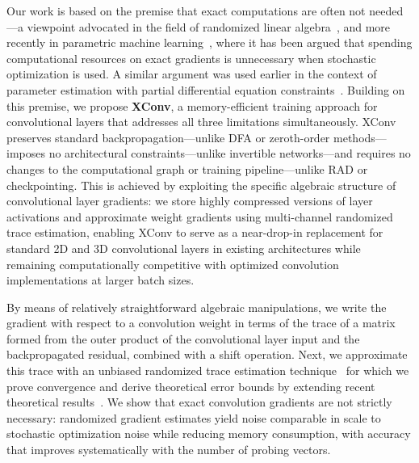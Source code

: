 \documentclass[10pt]{article}
\begin{document}
Our work is based on the premise that exact computations are often not needed---a viewpoint advocated in the field of randomized linear algebra~\citep{TroppLR,martinsson_tropp_2020}, and more recently in parametric machine learning~\citep{oktay2020randomized}, where it has been argued that spending computational resources on exact gradients is unnecessary when stochastic optimization is used. A similar argument was used earlier in the context of parameter estimation with partial differential equation constraints~\citep{haber10TRemp,Aravkin11TRridr,vanLeeuwen2014SISC3Dfds}. Building on this premise, we propose \textbf{XConv}, a memory-efficient training approach for convolutional layers that addresses all three limitations simultaneously. XConv preserves standard backpropagation---unlike DFA or zeroth-order methods---imposes no architectural constraints---unlike invertible networks---and requires no changes to the computational graph or training pipeline---unlike RAD or checkpointing. This is achieved by exploiting the specific algebraic structure of convolutional layer gradients: we store highly compressed versions of layer activations and approximate weight gradients using multi-channel randomized trace estimation, enabling XConv to serve as a near-drop-in replacement for standard 2D and 3D convolutional layers in existing architectures while remaining computationally competitive with optimized convolution implementations at larger batch sizes.

By means of relatively straightforward algebraic manipulations, we write the gradient with respect to a convolution weight in terms of the trace of a matrix formed from the outer product of the convolutional layer input and the backpropagated residual, combined with a shift operation. Next, we approximate this trace with an unbiased randomized trace estimation technique~\citep{Hutchinson, Avron, roosta-trace-bound, martinsson_tropp_2020, hutchpp} for which we prove convergence and derive theoretical error bounds by extending recent theoretical results~\citep{cortinovis2020randomized}. We show that exact convolution gradients are not strictly necessary: randomized gradient estimates yield noise comparable in scale to stochastic optimization noise while reducing memory consumption, with accuracy that improves systematically with the number of probing vectors.
\end{document}
